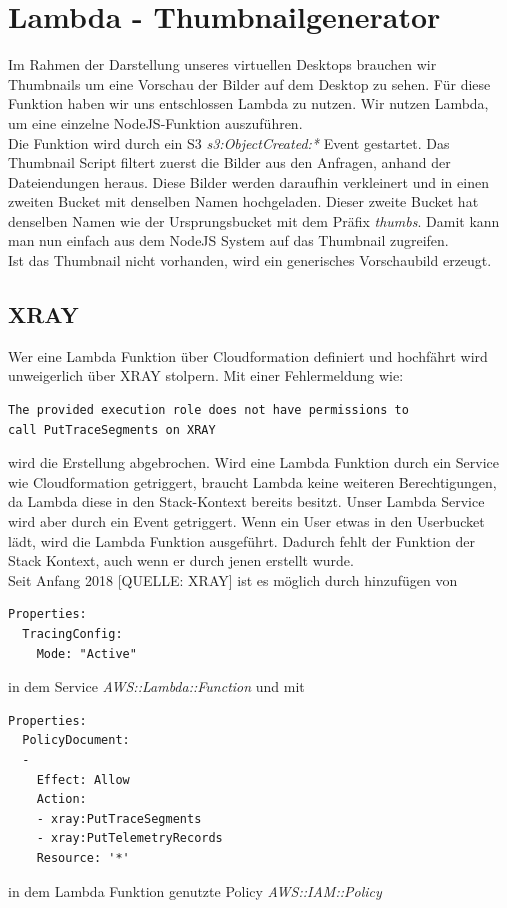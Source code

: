 \documentclass[a4paper, 12pt]{scrreprt}
\begin{document}

\section{Lambda - Thumbnailgenerator}
Im Rahmen der Darstellung unseres virtuellen Desktops brauchen wir Thumbnails um eine Vorschau der Bilder auf dem Desktop zu sehen. Für diese Funktion haben wir  uns entschlossen Lambda zu nutzen. Wir nutzen Lambda, um eine einzelne NodeJS-Funktion auszuführen. \\
Die Funktion wird durch ein S3 \textit{s3:ObjectCreated:*} Event gestartet. Das Thumbnail Script filtert zuerst die Bilder aus den Anfragen, anhand der Dateiendungen heraus. Diese Bilder werden daraufhin verkleinert und in einen zweiten Bucket mit denselben Namen hochgeladen. Dieser zweite Bucket hat denselben Namen wie der Ursprungsbucket mit dem Präfix \textit{thumbs}. Damit kann man nun einfach aus dem NodeJS System auf das Thumbnail zugreifen. \\
Ist das Thumbnail nicht vorhanden, wird ein generisches Vorschaubild erzeugt. 
\subsection{XRAY}
Wer eine Lambda Funktion über Cloudformation definiert und hochfährt wird unweigerlich über XRAY stolpern. Mit einer Fehlermeldung wie: 
\begin{lstlisting}
The provided execution role does not have permissions to
call PutTraceSegments on XRAY
\end{lstlisting}
wird die Erstellung abgebrochen. Wird eine Lambda Funktion durch ein Service wie Cloudformation getriggert, braucht Lambda keine weiteren Berechtigungen, da Lambda diese in den Stack-Kontext bereits besitzt. Unser Lambda Service wird aber durch ein Event getriggert. Wenn ein User etwas in den Userbucket lädt, wird die Lambda Funktion ausgeführt. Dadurch fehlt der Funktion der Stack Kontext, auch wenn er durch jenen erstellt wurde. \\
Seit Anfang 2018 [QUELLE: XRAY] ist es möglich durch hinzufügen von
\begin{lstlisting}
Properties:
  TracingConfig:
    Mode: "Active"
\end{lstlisting} 
in dem Service \textit{AWS::Lambda::Function} und mit 
\begin{lstlisting}
Properties:
  PolicyDocument:
  -
    Effect: Allow
    Action:
    - xray:PutTraceSegments
    - xray:PutTelemetryRecords
    Resource: '*'
\end{lstlisting} 
in dem Lambda Funktion genutzte Policy \textit{AWS::IAM::Policy}
\end{document}
